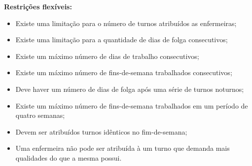 \textbf{Restrições flexíveis:}
\begin{itemize}
\item Existe uma limitação para o número de turnos atribuídos as enfermeiras; 
\item Existe uma limitação para a quantidade de dias de folga consecutivos; 
\item Existe um máximo número de dias de trabalho consecutivos;
\item Existe um máximo número de fins-de-semana trabalhados consecutivos;
\item Deve haver um número de dias de folga após uma série de turnos noturnos;
\item Existe um máximo número de fins-de-semana trabalhados em um período de quatro semanas; 
\item Devem ser atribuídos turnos idênticos no fim-de-semana;
\item Uma enfermeira não pode ser atribuída à um turno que demanda mais qualidades do que a mesma possui.
\end{itemize}





